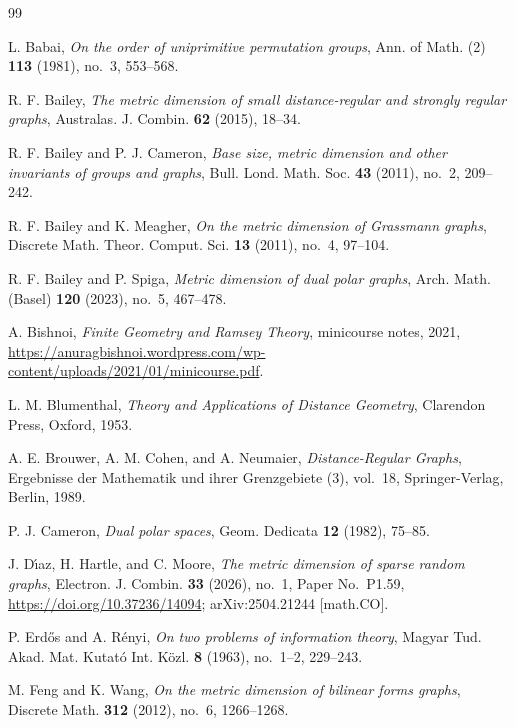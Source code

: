 \documentclass[11pt]{article}
\theoremstyle{definition}
\theoremstyle{remark}
\begin{document}
\begin{thebibliography}{99}

L. Babai,
\emph{On the order of uniprimitive permutation groups},
Ann. of Math. (2) \textbf{113} (1981), no.~3, 553--568.

R. F. Bailey,
\emph{The metric dimension of small distance-regular and strongly regular
graphs},
Australas. J. Combin. \textbf{62} (2015), 18--34.

R. F. Bailey and P. J. Cameron,
\emph{Base size, metric dimension and other invariants of groups and
graphs},
Bull. Lond. Math. Soc. \textbf{43} (2011), no.~2, 209--242.

R. F. Bailey and K. Meagher,
\emph{On the metric dimension of Grassmann graphs},
Discrete Math. Theor. Comput. Sci. \textbf{13} (2011), no.~4, 97--104.

R. F. Bailey and P. Spiga,
\emph{Metric dimension of dual polar graphs},
Arch. Math. (Basel) \textbf{120} (2023), no.~5, 467--478.

A. Bishnoi,
\emph{Finite Geometry and Ramsey Theory},
minicourse notes, 2021,
\url{https://anuragbishnoi.wordpress.com/wp-content/uploads/2021/01/minicourse.pdf}.

L. M. Blumenthal,
\emph{Theory and Applications of Distance Geometry},
Clarendon Press, Oxford, 1953.

A. E. Brouwer, A. M. Cohen, and A. Neumaier,
\emph{Distance-Regular Graphs},
Ergebnisse der Mathematik und ihrer Grenzgebiete (3), vol.~18,
Springer-Verlag, Berlin, 1989.

P. J. Cameron,
\emph{Dual polar spaces},
Geom. Dedicata \textbf{12} (1982), 75--85.

J. D\'{\i}az, H. Hartle, and C. Moore,
\emph{The metric dimension of sparse random graphs},
Electron. J. Combin. \textbf{33} (2026), no.~1, Paper No.~P1.59,
\url{https://doi.org/10.37236/14094}; arXiv:2504.21244 [math.CO].

P. Erd\H{o}s and A. R\'enyi,
\emph{On two problems of information theory},
Magyar Tud. Akad. Mat. Kutat\'o Int. K\"ozl. \textbf{8} (1963), no.~1--2,
229--243.

M. Feng and K. Wang,
\emph{On the metric dimension of bilinear forms graphs},
Discrete Math. \textbf{312} (2012), no.~6, 1266--1268.


\end{thebibliography}
\end{document}
